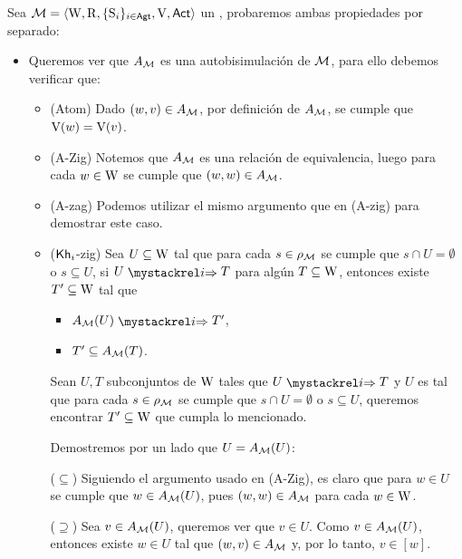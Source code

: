 \begin{demostracion}
    Sea $\mathcal{M}=\langle \mathrm{W},\mathrm{R},\{ \mathrm{S}_i \}_{i \in {\rm \sf Agt}},\mathrm{V},{\rm \sf Act} \rangle$ un \ults, probaremos ambas propiedades por separado:

    \begin{itemize}
        \item Queremos ver que $A_{\mathcal{M}}$ es una autobisimulación de $\mathcal{M}$, para ello debemos verificar que:
        \begin{itemize}
            \item (Atom) Dado $(w,v) \in A_{\mathcal{M}}$, por definición de $A_{\mathcal{M}}$, se cumple que $\mathrm{V}(w) = \mathrm{V}(v)$.
            \item (A-Zig) Notemos que $A_{\mathcal{M}}$ es una relación de equivalencia, luego para cada $w\in \mathrm{W}$ se cumple que $(w,w) \in A_{\mathcal{M}}$.
            \item (A-zag) Podemos utilizar el mismo argumento que en (A-zig) para demostrar este caso.
            \item ($\mathsf{Kh}_i$-zig) Sea $U \subseteq \mathrm{W}$ tal que para cada $s \in \rho_{\mathcal{M}}$ se cumple que $s \cap U = \emptyset$ o 
            $s \subseteq U$, si $U \ultsExecAgi T$ para algún $T \subseteq \mathrm{W}$, entonces existe $T' \subseteq \mathrm{W}$ tal que
                \begin{multicols}{2}
                    \begin{itemize}
                        \item $A_\modults(U) \ultsExecAgi T'$, 
                        \item $T' \subseteq A_{\mathcal{M}}(T)$.
                    \end{itemize}
                \end{multicols}

            Sean $U,T$ subconjuntos de $\mathrm{W}$ tales que $U \ultsExecAgi T$ y $U$ es tal que para cada $s \in \rho_{\mathcal{M}}$ se cumple que 
            $s \cap U = \emptyset$ o $s \subseteq U$, queremos encontrar $T' \subseteq \mathrm{W}$ que cumpla lo mencionado.
            
            Demostremos por un lado que $U = A_{\mathcal{M}}(U)$:
            
            ($\subseteq$) Siguiendo el argumento usado en (A-Zig), es claro que para $w \in U$ se cumple que $w \in A_{\mathcal{M}}(U)$, 
            pues $(w,w) \in A_{\mathcal{M}}$ para cada $w \in \mathrm{W}$. 
            
            ($\supseteq$) Sea $v \in A_{\mathcal{M}}(U)$, queremos ver que $v \in U$.
            Como $v \in A_{\mathcal{M}}(U)$, entonces existe $w \in U$ tal que $(w,v) \in A_{\mathcal{M}}$ y, por lo tanto, $v \in [w]$.
            

\end{itemize}
\end{itemize}
\end{demostracion}
